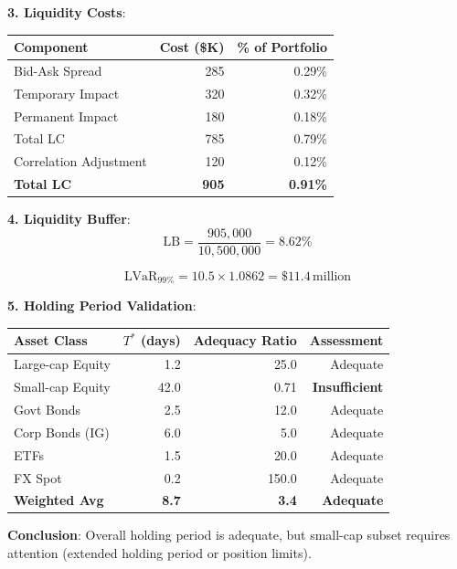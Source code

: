 \documentclass[11pt,a4paper]{article}
\begin{document}
\textbf{3. Liquidity Costs}:
\begin{table}[h]
\centering
\begin{tabular}{@{}lrr@{}}
\toprule
Component & Cost (\$K) & \% of Portfolio \\
\midrule
Bid-Ask Spread & 285 & 0.29\% \\
Temporary Impact & 320 & 0.32\% \\
Permanent Impact & 180 & 0.18\% \\
\midrule
Total LC & 785 & 0.79\% \\
Correlation Adjustment & 120 & 0.12\% \\
\midrule
\textbf{Total LC} & \textbf{905} & \textbf{0.91\%} \\
\bottomrule
\end{tabular}
\end{table}

\textbf{4. Liquidity Buffer}:
\begin{equation}
\text{LB} = \frac{905,000}{10,500,000} = 8.62\%
\end{equation}

\begin{equation}
\text{LVaR}_{99\%} = 10.5 \times 1.0862 = \$11.4\,\text{million}
\end{equation}

\textbf{5. Holding Period Validation}:

\begin{table}[h]
\centering
\begin{tabular}{@{}lrrr@{}}
\toprule
Asset Class & $T^*$ (days) & Adequacy Ratio & Assessment \\
\midrule
Large-cap Equity & 1.2 & 25.0 & Adequate \\
Small-cap Equity & 42.0 & 0.71 & \textbf{Insufficient} \\
Govt Bonds & 2.5 & 12.0 & Adequate \\
Corp Bonds (IG) & 6.0 & 5.0 & Adequate \\
ETFs & 1.5 & 20.0 & Adequate \\
FX Spot & 0.2 & 150.0 & Adequate \\
\midrule
\textbf{Weighted Avg} & \textbf{8.7} & \textbf{3.4} & \textbf{Adequate} \\
\bottomrule
\end{tabular}
\end{table}

\textbf{Conclusion}: Overall holding period is adequate, but small-cap subset requires attention (extended holding period or position limits).
\end{document}
